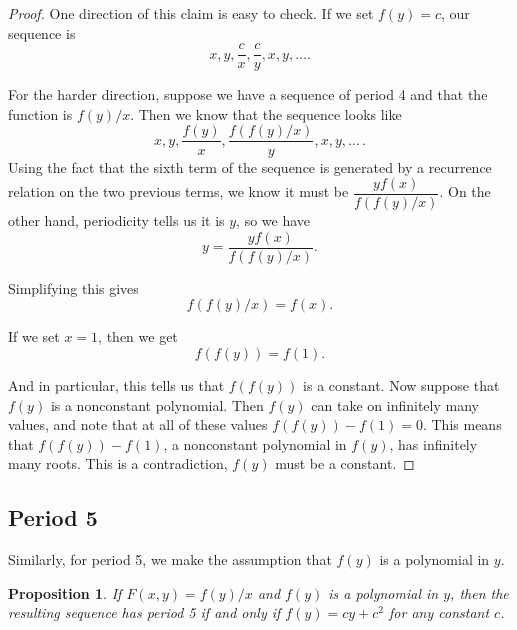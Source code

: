 \documentclass[12pt]{article}
\newtheorem{proposition}{Proposition}
\begin{document}
\begin{proof}
One direction of this claim is easy to check. If we set $f(y) = c$, our sequence is
\[x,y, \frac{c}{x}, \frac{c}{y}, x, y, \dots .\]

For the harder direction, suppose we have a sequence of period 4 and that the function is $f(y)/x$. Then we know that the sequence looks like
\begin{equation*}
x, y, \dfrac{f(y)}{x}, \dfrac{f(f(y)/x)}{y}, x, y, \dots \, .
\end{equation*}
Using the fact that the sixth term of the sequence is generated by a recurrence relation on the two previous terms, we know it must be $\dfrac{yf(x)}{f(f(y)/x)}$. On the other hand, periodicity tells us it is $y$, so we have
\[ y = \dfrac{yf(x)}{f(f(y)/x)}.\]

Simplifying this gives
\[ f(f(y)/x) = f(x). \]

If we set $x = 1$, then we get
\[ f(f(y)) = f(1). \]

And in particular, this tells us that $f(f(y))$ is a constant. Now suppose that $f(y)$ is a nonconstant polynomial. Then $f(y)$ can take on infinitely many values, and note that at all of these values $f(f(y)) - f(1) = 0$. This means that $f(f(y)) - f(1)$, a nonconstant polynomial in $f(y)$, has infinitely many roots. This is a contradiction, $f(y)$ must be a constant.
\end{proof}

\subsection{Period 5}

Similarly, for period 5, we make the assumption that $f(y)$ is a polynomial in $y$. 

\begin{proposition}
If $F(x,y) = f(y)/x$ and $f(y)$ is a polynomial in $y$, then the resulting sequence has period 5 if and only if $f(y) = cy + c^2$ for any constant $c$.
\end{proposition}
\end{document}
